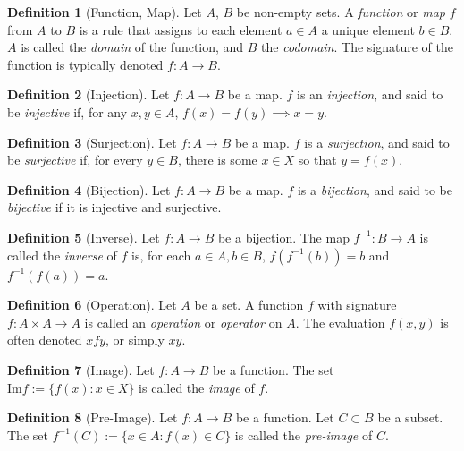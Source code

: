 \documentclass{article}
\theoremstyle{definition}
\newtheorem{definition}{Definition}[subsection]
\theoremstyle{theorem}
\begin{document}
\begin{definition}[Function, Map]
    Let $A$, $B$ be non-empty sets. A \textit{function} or \textit{map} $f$ from $A$ to $B$ is a rule that assigns to each element $a\in A$ a unique element $b\in B$. $A$ is called the \textit{domain} of the function, and $B$ the \textit{codomain}. The signature of the function is typically denoted $f:A\rightarrow B$.
\end{definition}
\begin{definition}[Injection]
    Let $f:A\rightarrow B$ be a map. $f$ is an \textit{injection}, and said to be \textit{injective} if, for any $x,y\in A$, $f(x)=f(y)\implies x=y$.
\end{definition}
\begin{definition}[Surjection]
    Let $f:A\rightarrow B$ be a map. $f$ is a \textit{surjection}, and said to be \textit{surjective} if, for every $y\in B$, there is some $x\in X$ so that $y=f(x)$.
\end{definition}
\begin{definition}[Bijection]
    Let $f:A\rightarrow B$ be a map. $f$ is a \textit{bijection}, and said to be \textit{bijective} if it is injective and surjective.
\end{definition}
\begin{definition}[Inverse]
    Let $f:A\rightarrow B$ be a bijection. The map $f^{-1}:B\rightarrow A$ is called the \textit{inverse} of $f$ is, for each $a\in A, b\in B$, $f(f^{-1}(b))=b$ and $f^{-1}(f(a))=a$.    
\end{definition}
\begin{definition}[Operation]
    Let $A$ be a set. A function $f$ with signature $f:A\times A \rightarrow A$ is called an \textit{operation} or \textit{operator} on $A$. The evaluation $f(x,y)$ is often denoted $xfy$, or simply $xy$.
\end{definition}






\begin{definition}[Image]
    Let $f:A\rightarrow B$ be a function. The set $\text{Im} f:=\{f(x): x\in X\}$ is called the \textit{image} of $f$.
\end{definition}
\begin{definition}[Pre-Image]
    Let $f:A\rightarrow B$ be a function. Let $C\subset B$ be a subset. The set $f^{-1}(C):=\{x\in A : f(x)\in C\}$ is called the \textit{pre-image} of $C$.
\end{definition}
\end{document}
